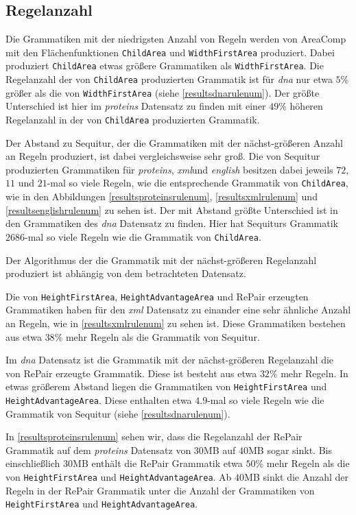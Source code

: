 \subsection{Regelanzahl}

Die Grammatiken mit der niedrigsten Anzahl von Regeln werden von AreaComp mit den Flächenfunktionen \texttt{ChildArea} und \texttt{WidthFirstArea} produziert. Dabei produziert \texttt{ChildArea} etwas größere Grammatiken als \texttt{WidthFirstArea}. Die Regelanzahl der von \texttt{ChildArea} produzierten Grammatik ist für \emph{dna} nur etwa $5$\% größer als die von \texttt{WidthFirstArea} (siehe \autoref{resultsdnarulenum}). 
Der größte Unterschied ist hier im \emph{proteins} Datensatz zu finden mit einer $49$\% höheren Regelanzahl in der von \texttt{ChildArea} produzierten Grammatik. 

Der Abstand zu Sequitur, der die Grammatiken mit der nächst-größeren Anzahl an Regeln produziert, ist dabei vergleichsweise sehr groß. Die von Sequitur produzierten Grammatiken für \emph{proteins}, \emph{xml}und \emph{english} besitzen dabei jeweils $72$, $11$ und $21$-mal so viele Regeln, wie die entsprechende Grammatik von \texttt{ChildArea}, wie in den Abbildungen \autoref{resultsproteinsrulenum}, \autoref{resultsxmlrulenum} und \autoref{resultsenglishrulenum} zu sehen ist.
Der mit Abstand größte Unterschied ist in den Grammatiken des \emph{dna} Datensatz zu finden. Hier hat Sequiturs Grammatik $2686$-mal so viele Regeln wie die Grammatik von \texttt{ChildArea}. 

Der Algorithmus der die Grammatik mit der nächst-größeren Regelanzahl produziert ist abhängig von dem betrachteten Datensatz. 

Die von \texttt{HeightFirstArea}, \texttt{HeightAdvantageArea} und RePair erzeugten Grammatiken haben für den \emph{xml} Datensatz zu einander eine sehr ähnliche Anzahl an Regeln, wie in \autoref{resultsxmlrulenum} zu sehen ist. Diese Grammatiken bestehen aus etwa $38$\% mehr Regeln als die Grammatik von Sequitur.

Im \emph{dna} Datensatz ist die Grammatik mit der nächst-größeren Regelanzahl die von RePair erzeugte Grammatik. Diese ist besteht aus etwa $32$\% mehr Regeln. In etwas größerem Abstand liegen die Grammatiken von \texttt{HeightFirstArea} und \texttt{HeightAdvantageArea}. Diese enthalten etwa $4.9$-mal so viele Regeln wie die Grammatik von Sequitur (siehe \autoref{resultsdnarulenum}).

In \autoref{resultsproteinsrulenum} sehen wir, dass die Regelanzahl der RePair Grammatik auf dem \emph{proteins} Datensatz von $30$MB auf $40$MB sogar sinkt. Bis einschließlich $30$MB enthält die RePair Grammatik etwa $50$\% mehr Regeln als die von \texttt{HeightFirstArea} und \texttt{HeightAdvantageArea}. Ab $40$MB sinkt die Anzahl der Regeln in der RePair Grammatik unter die Anzahl der Grammatiken von \texttt{HeightFirstArea} und \texttt{HeightAdvantageArea}.

